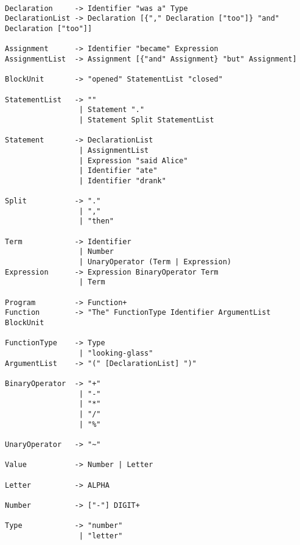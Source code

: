 \documentclass[a4wide, 11pt]{article}
\begin{document}
\begin{verbatim}

Declaration     -> Identifier "was a" Type
DeclarationList -> Declaration [{"," Declaration ["too"]} "and" Declaration ["too"]]

Assignment      -> Identifier "became" Expression
AssignmentList  -> Assignment [{"and" Assignment} "but" Assignment]

BlockUnit       -> "opened" StatementList "closed"

StatementList   -> ""
                 | Statement "."
                 | Statement Split StatementList
               
Statement       -> DeclarationList
                 | AssignmentList
                 | Expression "said Alice"
                 | Identifier "ate"
                 | Identifier "drank"

Split           -> "."
                 | ","
                 | "then"

Term            -> Identifier
                 | Number
                 | UnaryOperator (Term | Expression)
Expression      -> Expression BinaryOperator Term
                 | Term

Program         -> Function+
Function        -> "The" FunctionType Identifier ArgumentList BlockUnit

FunctionType    -> Type
                 | "looking-glass"
ArgumentList    -> "(" [DeclarationList] ")"

BinaryOperator  -> "+"
                 | "-"
                 | "*"
                 | "/" 
                 | "%"

UnaryOperator   -> "~" 

Value           -> Number | Letter

Letter          -> ALPHA

Number          -> ["-"] DIGIT+

Type            -> "number"
                 | "letter"

\end{verbatim}





    
\end{document}

